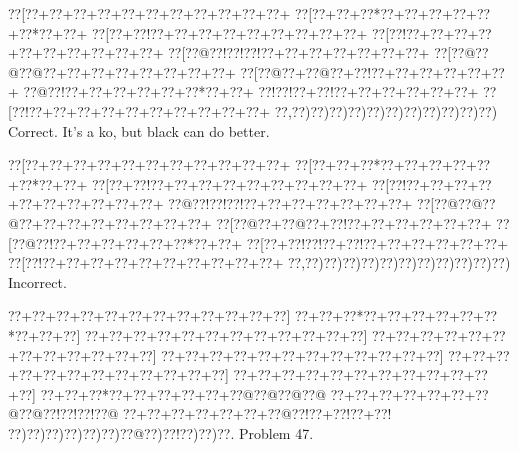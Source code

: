 \documentclass[a5paper]{article}
\begin{document}
\begin{center}
{\goo
\0??[\0??+\0??+\0??+\0??+\0??+\0??+\0??+\0??+\0??+\0??+\0??+
\0??[\0??+\0??+\0??*\0??+\0??+\0??+\0??+\0??+\0??*\0??+\0??+
\0??[\0??+\0??!\0??+\0??+\0??+\0??+\0??+\0??+\0??+\0??+\0??+
\0??[\0??!\0??+\0??+\0??+\0??+\0??+\0??+\0??+\0??+\0??+\0??+
\0??[\0??@\0??!\0??!\0??!\0??+\0??+\0??+\0??+\0??+\0??+\0??+
\0??[\0??@\0??@\0??@\0??+\0??+\0??+\0??+\0??+\0??+\0??+\0??+
\0??[\0??@\0??+\0??@\0??+\0??!\0??+\0??+\0??+\0??+\0??+\0??+
\0??@\0??!\0??+\0??+\0??+\0??+\0??+\0??*\0??+\0??+
\0??!\0??!\0??+\0??!\0??+\0??+\0??+\0??+\0??+\0??+
\0??[\0??!\0??+\0??+\0??+\0??+\0??+\0??+\0??+\0??+\0??+\0??+
\0??,\0??)\0??)\0??)\0??)\0??)\0??)\0??)\0??)\0??)\0??)\0??)
}
Correct. It's a ko, but black can do better.

\end{center}
\begin{center}
{\goo
\0??[\0??+\0??+\0??+\0??+\0??+\0??+\0??+\0??+\0??+\0??+\0??+
\0??[\0??+\0??+\0??*\0??+\0??+\0??+\0??+\0??+\0??*\0??+\0??+
\0??[\0??+\0??!\0??+\0??+\0??+\0??+\0??+\0??+\0??+\0??+\0??+
\0??[\0??!\0??+\0??+\0??+\0??+\0??+\0??+\0??+\0??+\0??+\0??+
\0??@\0??!\0??!\0??!\0??+\0??+\0??+\0??+\0??+\0??+\0??+
\0??[\0??@\0??@\0??@\0??+\0??+\0??+\0??+\0??+\0??+\0??+\0??+
\0??[\0??@\0??+\0??@\0??+\0??!\0??+\0??+\0??+\0??+\0??+\0??+
\0??[\0??@\0??!\0??+\0??+\0??+\0??+\0??+\0??*\0??+\0??+
\0??[\0??+\0??!\0??!\0??+\0??!\0??+\0??+\0??+\0??+\0??+\0??+
\0??[\0??!\0??+\0??+\0??+\0??+\0??+\0??+\0??+\0??+\0??+\0??+
\0??,\0??)\0??)\0??)\0??)\0??)\0??)\0??)\0??)\0??)\0??)\0??)
}
Incorrect. 

\end{center}
\newpage
\begin{center}
{\goo
\0??+\0??+\0??+\0??+\0??+\0??+\0??+\0??+\0??+\0??+\0??+\0??]
\0??+\0??+\0??*\0??+\0??+\0??+\0??+\0??+\0??*\0??+\0??+\0??]
\0??+\0??+\0??+\0??+\0??+\0??+\0??+\0??+\0??+\0??+\0??+\0??]
\0??+\0??+\0??+\0??+\0??+\0??+\0??+\0??+\0??+\0??+\0??+\0??]
\0??+\0??+\0??+\0??+\0??+\0??+\0??+\0??+\0??+\0??+\0??+\0??]
\0??+\0??+\0??+\0??+\0??+\0??+\0??+\0??+\0??+\0??+\0??+\0??]
\0??+\0??+\0??+\0??+\0??+\0??+\0??+\0??+\0??+\0??+\0??+\0??]
\0??+\0??+\0??*\0??+\0??+\0??+\0??+\0??+\0??@\0??@\0??@\0??@
\0??+\0??+\0??+\0??+\0??+\0??+\0??@\0??@\0??!\0??!\0??!\0??@
\0??+\0??+\0??+\0??+\0??+\0??+\0??@\0??!\0??+\0??!\0??+\0??!
\0??)\0??)\0??)\0??)\0??)\0??)\0??@\0??)\0??!\0??)\0??)\0??.
}
Problem 47.

\end{center}
\end{document}
